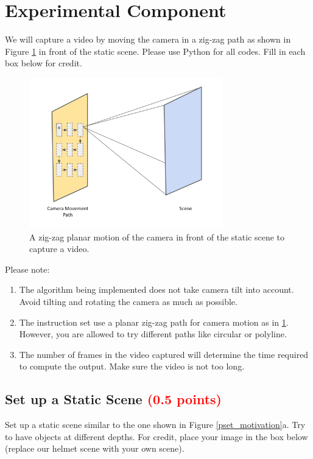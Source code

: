 \documentclass[answers]{exam}
\newcommand{\mypoints}[1]{\textcolor{red}{(#1 points)}}
\begin{document}
\section{Experimental Component}

We will capture a video by moving the camera in a zig-zag path as shown in Figure \ref{camera_motion} in front of the static scene. Please use Python for all codes. Fill in each box below for credit.\\


\begin{figure}[h]
\centering

    \includegraphics[width=0.75\textwidth]{pset_camera_motion.png}
    \captionsetup{justification=centering}
    \caption{A zig-zag planar motion of the camera in front of the static scene to capture a video.}
    \label{camera_motion}
\end{figure}

Please note:
\begin{enumerate}
\item The algorithm being implemented does not take camera tilt into account. Avoid tilting and rotating the camera as much as possible. 
\item The instruction set use a planar zig-zag path for camera motion as in \ref{camera_motion}. However, you are allowed to try different paths like circular or polyline.
\item The number of frames in the video captured will determine the time required to compute the output. Make sure the video is not too long.
\end{enumerate}


\subsection{Set up a Static Scene \mypoints{0.5} } \label{sssec:staticscene}
Set up a static scene similar to the one shown in Figure \ref{pset_motivation}a. Try to have objects at different depths. For credit, place your image in the box below (replace our helmet scene with your own scene).  
\end{document}
